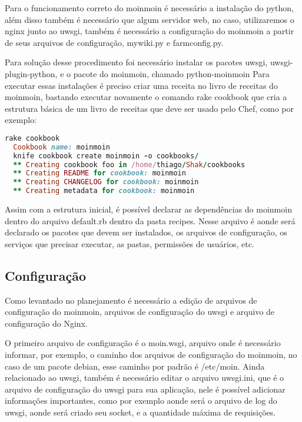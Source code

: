 Para o funcionamento correto do moinmoin é necessário a instalação do python, além
disso também é necessário que algum servidor web, no caso, utilizaremos o nginx
junto ao uwsgi, também é necessário a configuração do moinmoin a partir de seus
arquivos de configuração, mywiki.py e farmconfig.py.

Para solução desse procedimento foi necessário instalar os pacotes uwsgi,
uwsgi-plugin-python, e o pacote do moinmoin, chamado python-moinmoin
Para executar essas instalações é preciso criar uma receita no livro de receitas
do moinmoin, bastando executar novamente o comando rake cookbook que cria a
estrutura básica de um livro de receitas que deve ser usado pelo Chef, como por exemplo:

\begin{lstlisting}[language=Ruby,label=dice_index,caption={Exemplo de criação de estrutura básica de livro de receitas do moinmoin com shak}]
  rake cookbook
  Cookbook name: moinmoin
  knife cookbook create moinmoin -o cookbooks/
  ** Creating cookbook foo in /home/thiago/Shak/cookbooks
  ** Creating README for cookbook: moinmoin
  ** Creating CHANGELOG for cookbook: moinmoin
  ** Creating metadata for cookbook: moinmoin
\end{lstlisting}

Assim com a estrutura inicial, é possível declarar as dependências do moinmoin
dentro do arquivo default.rb dentro da pasta recipes. Nesse arquivo é aonde
será declarado os pacotes que devem ser instalados, os arquivos de configuração,
os serviços que precisar executar, as pastas, permissões de usuários, etc.

\subsection{Configuração}

Como levantado no planejamento é necessário a edição de arquivos de configuração
do moinmoin, arquivos de configuração do uwsgi e arquivo de configuração
do Nginx.

O primeiro arquivo de configuração é o moin.wsgi, arquivo onde é necessário
informar, por exemplo, o caminho dos arquivos de configuração do moinmoin, no caso
de um pacote debian, esse caminho por padrão é  /etc/moin. Ainda relacionado
ao uwsgi, também é necessário editar o arquivo uwsgi.ini, que é o arquivo de configuração
do uwsgi para sua aplicação, nele é possível adicionar informações importantes, como
por exemplo aonde será o arquivo de log do uwsgi, aonde será criado seu socket,
e a quantidade máxima de requisições.

